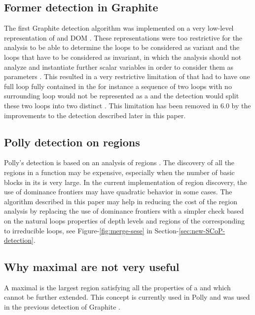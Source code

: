 \documentclass{sig-alternate}
\begin{document}
\subsection{Former \SCoP{} detection in Graphite}
\label{subsec:graphite-SCoP}
The first Graphite \SCoP{} detection algorithm was implemented on a very low-level
representation of \CFG{} and DOM \cite{graphite}.  These representations were too
restrictive for the \scev{} analysis to be able to determine the loops to be
considered as variant and the loops that have to be considered as invariant, in
which the \scev{} analysis should not analyze and instantiate further scalar
variables in order to consider them as parameters \cite{scev}.  This resulted in
a very restrictive limitation of  that had to have one full loop fully
contained in the \SCoP{:} for instance a sequence of two loops with no surrounding
loop would not be represented as a \SCoP{} and the \SCoP{} detection would split these
two loops into two distinct .  This limitation has been removed in \GCC{} 6.0
by the improvements to the \SCoP{} detection described later in this paper.

\subsection{Polly \SCoP{} detection on \SESE{} regions}
\label{subsec:polly-SCoP}
Polly's \SCoP{} detection is based on an analysis of \SESE{} regions \cite{polly}.
The discovery
of all the regions in a function may be expensive, especially when the number of
basic blocks in its \CFG{} is very large.  In the current \LLVM{} implementation of
\SESE{} region discovery, the use of dominance frontiers may have quadratic
behavior in some cases.  The algorithm described in this paper may help in
reducing the cost of the \SESE{} region analysis by replacing the use of dominance
frontiers with a simpler check based on the natural loops properties of depth
levels and regions of the \CFG{} corresponding to irreducible loops, see
Figure-\ref{fig:merge-sese} in Section-\ref{sec:new-SCoP-detection}.

\subsection{Why maximal  are not very useful}
\label{subsec:maximality}
A maximal \SCoP{} is the largest region satisfying all the properties of a \SCoP{} and
which cannot be further extended.  This concept is currently used in Polly
\cite{polly} and was used in the previous \SCoP{} detection of Graphite
\cite{graphite}.
\end{document}
